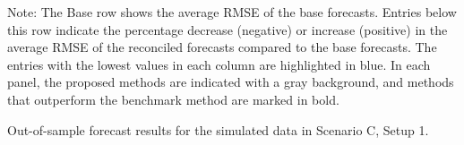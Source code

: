 \documentclass[
  11pt]{article}
\theoremstyle{plain}
\theoremstyle{remark}
\begin{document}
\begin{table}
{{\begin{threeparttable}
\begin{tablenotes}[para]
\item Note: The Base row shows the average RMSE of the base forecasts. Entries below this row indicate the percentage decrease (negative) or increase (positive) in the average RMSE of the reconciled forecasts compared to the base forecasts. The entries with the lowest values in each column are highlighted in blue. In each panel, the proposed methods are indicated with a gray background, and methods that outperform the benchmark method are marked in bold.
\end{tablenotes}
\end{threeparttable}}

}

\end{table}%

\begin{table}

\caption{\label{tbl-s3-rmse}Out-of-sample forecast results for the
simulated data in Scenario C, Setup 1.}

\centering{

}
\end{table}
\end{document}
